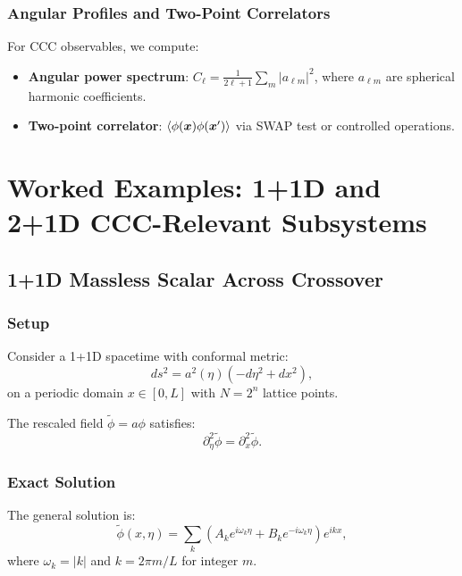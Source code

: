 \documentclass[11pt,a4paper]{article}
\newcommand{\vecx}{\bm{x}}
\theoremstyle{plain}
\theoremstyle{definition}
\theoremstyle{remark}
\begin{document}
\subsubsection{Angular Profiles and Two-Point Correlators}

For CCC observables, we compute:
\begin{itemize}
    \item \textbf{Angular power spectrum}: $C_\ell = \frac{1}{2\ell+1}\sum_m |a_{\ell m}|^2$, where $a_{\ell m}$ are spherical harmonic coefficients.
    \item \textbf{Two-point correlator}: $\braket{\phi(\vecx)\phi(\vecx')}$ via SWAP test or controlled operations.
\end{itemize}

\section{Worked Examples: 1+1D and 2+1D CCC-Relevant Subsystems}\label{sec:examples}

\subsection{1+1D Massless Scalar Across Crossover}\label{subsec:1d_example}

\subsubsection{Setup}

Consider a 1+1D spacetime with conformal metric:
\begin{equation}
    ds^2 = a^2(\eta)(-d\eta^2 + dx^2),
\end{equation}
on a periodic domain $x \in [0, L]$ with $N = 2^n$ lattice points.

The rescaled field $\tilde{\phi} = a\phi$ satisfies:
\begin{equation}
    \partial_\eta^2 \tilde{\phi} = \partial_x^2 \tilde{\phi}.
\end{equation}

\subsubsection{Exact Solution}

The general solution is:
\begin{equation}\label{eq:1d_exact}
    \tilde{\phi}(x, \eta) = \sum_{k} \left(A_k e^{i\omega_k \eta} + B_k e^{-i\omega_k \eta}\right) e^{ikx},
\end{equation}
where $\omega_k = |k|$ and $k = 2\pi m/L$ for integer $m$.
\end{document}
